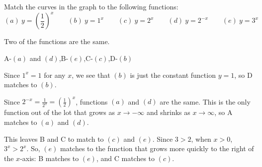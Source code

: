 %
%
%
\subsection*{\Conceptual}


\begin{Mquestion}
Match the curves in the graph to the following functions:
\[ (a)~ y=\left(\frac{1}{2}\right)^x \qquad(b)~ y=1^x\qquad (c)~ y=2^x  \qquad (d)~ y=2^{-x}\qquad(e)~ y=3^x  \]
\begin{center}
\end{center}
\end{Mquestion}
\begin{hint} Two of the functions are the same.
\end{hint}
\begin{answer} A-$(a)$ and $(d)$,\quad B-$(e)$,\quad C-$(c)$,\quad D-$(b)$
\end{answer}
\begin{solution} Since $1^x=1$ for any $x$, we see that $(b)$ is just the constant function $y=1$, so D matches to $(b)$.

Since $2^{-x}=\frac{1}{2^x}=\left(\frac{1}{2}\right)^x$, functions $(a)$ and $(d)$ are the same. This is the only function out of the lot that grows as $x\to-\infty$ and shrinks as $x \to \infty$, so A matches to $(a)$ and $(d)$.

This leaves B and C to match to $(c)$ and $(e)$. Since $3>2$, when $x>0$, $3^x>2^x$. So, $(e)$ matches to the function that grows more quickly to the right of the $x$-axis: B matches to $(e)$, and C matches to $(c)$.
\end{solution}

